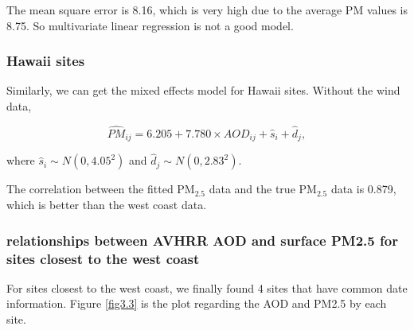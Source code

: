 \documentclass[10pt]{article}
\begin{document}
The mean square error is 8.16, which is very high due to the average PM values is 8.75. So multivariate linear regression is not a good model.

\subsubsection{Hawaii sites}
Similarly, we can get the mixed effects model for Hawaii sites.
Without the wind data,

$$\hat{PM}_{ij} = 6.205 + 7.780\times AOD_{ij} + \hat{s}_i + \hat{d}_j, $$

where $\hat{s}_i\sim N(0, 4.05^2)$ and $\hat{d}_j\sim N(0, 2.83^2)$. 

The correlation between the fitted PM$_{2.5}$ data and the true PM$_{2.5}$ data is 0.879, which is better than the west coast data. 


%
%
%
%


\subsubsection{relationships between AVHRR AOD and surface PM2.5 for sites closest to the west coast}

For sites closest to the west coast, we finally found 4 sites that have common date information. Figure \ref{fig3.3} is the plot regarding the AOD and PM2.5 by each site. 
\end{document}
